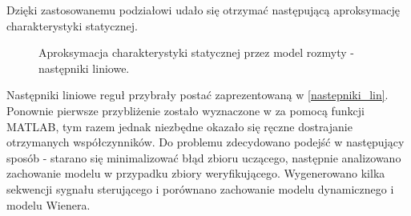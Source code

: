 \newpage

\noindent Dzięki zastosowanemu podziałowi udało się otrzymać następującą aproksymację charakterystyki statycznej.

\begin{figure}[h!]
\centering
{}
\hfill
{}
\caption{Aproksymacja charakterystyki statycznej przez model rozmyty - następniki liniowe.}
\end{figure}

Następniki liniowe reguł przybrały postać zaprezentowaną w \ref{nastepniki_lin}. Ponownie pierwsze przybliżenie zostało wyznaczone w za pomocą funkcji MATLAB, tym razem jednak niezbędne okazało się ręczne dostrajanie otrzymanych współczynników. Do problemu zdecydowano podejść w następujący sposób - starano się minimalizować błąd zbioru uczącego, następnie analizowano zachowanie modelu w przypadku zbiory weryfikującego. Wygenerowano kilka sekwencji sygnału sterującego i porównano zachowanie modelu dynamicznego i modelu Wienera.

\newpage

